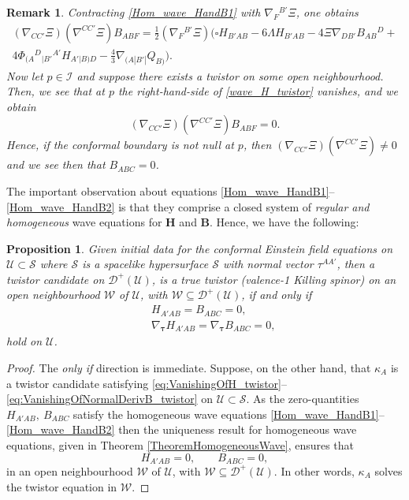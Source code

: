 \documentclass[10pt,a4paper]{article}
\theoremstyle{plain}
\newtheorem{proposition}{Proposition}
\newtheorem{remark}{Remark}
\def\bmB{{\bm B}}
\def\bmH{{\bm H}}
\begin{document}
\begin{remark}\label{Remark:VanshingOfBuchdahlAtBoundary}
{\em Contracting \eqref{Hom_wave_HandB1} with $\nabla_F{}^{B'}\Xi$, one obtains
\begin{multline}\label{wave_H_twistor}
 (\nabla_{CC'}\Xi)(\nabla^{CC'}\Xi) B_{ABF}  =\tfrac{1}{2}(\nabla_F{}^{B'}\Xi)(\square H_{B'AB} - 6 \Lambda H_{B'AB} - 4 \Xi
  \nabla_{DB'}B_{AB}{}^{D} + \\
  4
  \Phi_{(A}{}^{D}{}_{|B'}{}^{A'}H_{A'|B)D} - \tfrac{4}{3}
  \nabla_{(A|B'|}Q_{B)}).
\end{multline}
Now let $p\in\mathscr{I}$ and suppose there exists a twistor on some open neighbourhood. Then, we see that at $p$ the right-hand-side of \eqref{wave_H_twistor} vanishes, and we obtain
\[ (\nabla_{CC'}\Xi)(\nabla^{CC'}\Xi) B_{ABF}=0. \]
Hence, if the conformal boundary is not null at $p$, then $ (\nabla_{CC'}\Xi)(\nabla^{CC'}\Xi) \neq 0$ and we see then that 
$B_{ABC}=0$.
}
\end{remark}
The important observation about equations
\eqref{Hom_wave_HandB1}--\eqref{Hom_wave_HandB2} is that they comprise
a closed system of \emph{regular and homogeneous} wave equations for
$\bmH$ and $\bmB$. Hence, we have the following:
\begin{proposition}\label{Prop:Propagation_twistor}
  Given initial data for the conformal Einstein field equations on
  $\mathcal{U}\subset\mathcal{S}$ where $\mathcal{S}$ is a spacelike
  hypersurface $\mathcal{S}$ with normal vector $\tau^{AA'}$, then a
  twistor candidate on $\mathcal{D}^{+}(\mathcal{U})$, is a true
  twistor (valence-1 Killing spinor) on an open neighbourhood
  $\mathcal{W}$ of $\mathcal{U}$, with
  $\mathcal{W}\subseteq\mathcal{D}^{+}(\mathcal{U})$, if and only if
\begin{subequations}
\begin{eqnarray}
  &&
  H_{A'AB}=B_{ABC}=0,\label{eq:VanishingOfH_twistor}\\ &&\nabla_{\bm\tau}H_{A'AB}=\nabla_{\bm\tau}
  B_{ABC}=0, \label{eq:VanishingOfNormalDerivB_twistor}
\end{eqnarray}
\end{subequations}
hold on $\mathcal{U}$.
\end{proposition}
\begin{proof}
The \emph{only if} direction is immediate. Suppose, on the other hand,
that $\kappa_A$ is a twistor candidate satisfying
\eqref{eq:VanishingOfH_twistor}--\eqref{eq:VanishingOfNormalDerivB_twistor}
on $\mathcal{U}\subset\mathcal{S}$.  As the zero-quantities
$H_{A'AB},~B_{ABC}$ satisfy the homogeneous wave equations
\eqref{Hom_wave_HandB1}--\eqref{Hom_wave_HandB2} then the uniqueness
result for homogeneous wave equations, given in Theorem
\ref{TheoremHomogeneousWave}, ensures that
\[ H_{A'AB}=0,\qquad B_{ABC}=0,\]
in an open neighbourhood $\mathcal{W}$ of $\mathcal{U}$, with
$\mathcal{W}\subseteq\mathcal{D}^{+}(\mathcal{U})$.  In other words, $\kappa_{A}$
solves the twistor equation in $\mathcal{W}$.
\end{proof}
\end{document}
